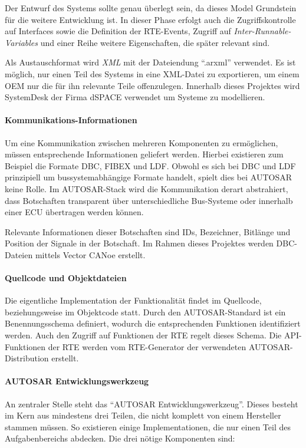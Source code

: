 \documentclass[
  a4paper,					    %
  twoside,
  DIV=calc,     				%
  bibliography=totoc,
  cleardoublepage=empty,
  ngerman,     					%
  final       					%
]{scrbook}
\begin{document}
Der Entwurf des Systems sollte genau überlegt sein, da dieses Model Grundstein für die weitere Entwicklung ist. In dieser Phase erfolgt auch die Zugriffskontrolle auf Interfaces sowie die Definition der RTE-Events, Zugriff auf \emph{Inter-Runnable-Variables} und einer Reihe weitere Eigenschaften, die später relevant sind.

Als Austauschformat wird \emph{XML} mit der Dateiendung "`.arxml"' verwendet. Es ist möglich, nur einen Teil des Systems in eine XML-Datei zu exportieren, um einem OEM nur die für ihn relevante Teile offenzulegen. Innerhalb dieses Projektes wird SystemDesk der Firma dSPACE verwendet um Systeme zu modellieren.

\paragraph{Kommunikations-Informationen}
Um eine Kommunikation zwischen mehreren Komponenten zu ermöglichen, müssen entsprechende Informationen geliefert werden. Hierbei existieren zum Beispiel die Formate DBC, FIBEX und LDF. Obwohl es sich bei DBC und LDF prinzipiell um bussystemabhängige Formate handelt, spielt dies bei AUTOSAR keine Rolle. Im AUTOSAR-Stack wird die Kommunikation derart abstrahiert, dass Botschaften transparent über unterschiedliche Bus-Systeme oder innerhalb einer ECU übertragen werden können.

Relevante Informationen dieser Botschaften sind IDs, Bezeichner, Bitlänge und Position der Signale in der Botschaft. Im Rahmen dieses Projektes werden DBC-Dateien mittels Vector CANoe erstellt.

\paragraph{Quellcode und Objektdateien}
Die eigentliche Implementation der Funktionalität findet im Quellcode, beziehungsweise im Objektcode statt. Durch den AUTOSAR-Standard ist ein Benennungsschema definiert, wodurch die entsprechenden Funktionen identifiziert werden. Auch den Zugriff auf Funktionen der RTE regelt dieses Schema. Die API-Funktionen der RTE werden vom RTE-Generator der verwendeten AUTOSAR-Distribution erstellt.

\paragraph{AUTOSAR Entwicklungswerkzeug}
An zentraler Stelle steht das "`AUTOSAR Entwicklungswerkzeug"'. Dieses besteht im Kern aus mindestens drei Teilen, die nicht komplett von einem Hersteller stammen müssen. So existieren einige Implementationen, die nur einen Teil des Aufgabenbereichs abdecken. Die drei nötige Komponenten sind:
\end{document}
